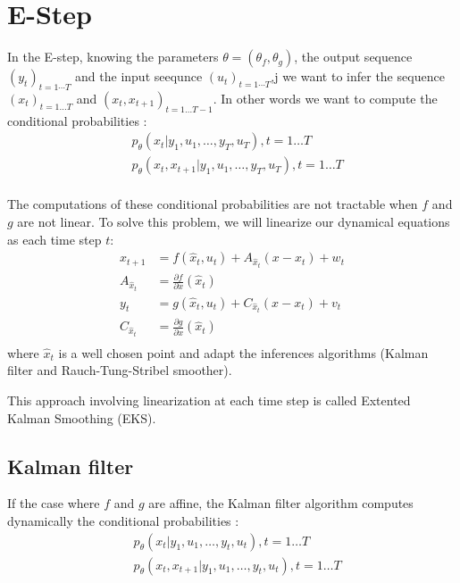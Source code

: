 \section{E-Step}

In the E-step, knowing the parameters $\theta = (\theta_f, \theta_g)$, the output sequence $(y_t)_{t=1 \cdots T}$ and the input seequnce $(u_t)_{t=1 \cdots T}$,j we want to infer the sequence $(x_t)_{t=1 \ldots T}$ and $(x_t, x_{t+1})_{t=1 \ldots T-1}$.
In other words we want to compute the conditional probabilities :
\begin{align*}
  &p_{\theta}\left(x_t|y_1, u_1, \ldots, y_T, u_T \right ), t=1 \ldots T\\
  &p_{\theta}\left(x_t, x_{t+1}|y_1, u_1, \ldots, y_T, u_T \right ), t=1 \ldots T\\
\end{align*}

The computations of these conditional probabilities are not tractable when $f$ and $g$ are not linear.
To solve this problem, we will linearize our dynamical equations as each time step $t$:
\begin{align*}
	x_{t+1} &= f(\hat{x}_t, u_t) + A_{\hat{x}_t} (x - x_t) + w_t\\
  A_{\hat{x}_t} &= \frac{\partial f}{\partial x}(\hat{x}_t)\\
	y_t &= g(\hat{x}_t, u_t) + C_{\hat{x}_t} (x - x_t) + v_t\\
  C_{\hat{x}_t} &= \frac{\partial g}{\partial x}(\hat{x}_t)\\
\end{align*}
where $\hat{x}_t$ is a well chosen point and adapt the inferences algorithms (Kalman filter and Rauch-Tung-Stribel smoother).

This approach involving linearization at each time step is called Extented Kalman Smoothing (EKS).

\subsection{Kalman filter}

 \newline

If the case where $f$ and $g$ are affine, the Kalman filter algorithm computes dynamically the conditional probabilities :
\begin{align*}
  &p_{\theta}\left(x_t|y_1, u_1, \ldots, y_t, u_t \right ), t=1 \ldots T\\
  &p_{\theta}\left(x_t, x_{t+1}|y_1, u_1, \ldots, y_t, u_t \right ), t=1 \ldots T\\
\end{align*}

